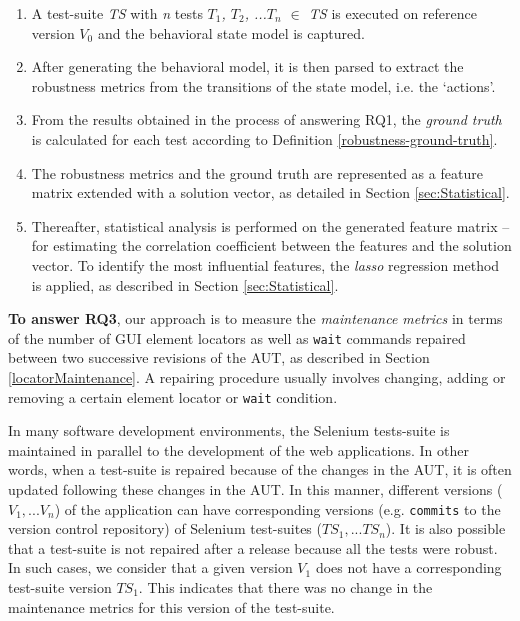 \begin{enumerate}

\item A test-suite \textit{TS} with \textit{n} tests \textit{$T_1$, $T_2$, ...$T_n$ $\in$ TS} is executed on reference version \textit{$V_{0}$} and the behavioral state model is captured. 

\item After generating the behavioral model, it is then parsed to extract the robustness metrics from the transitions of the state model, i.e. the `actions'.

\item From the results obtained in the process of answering RQ1, the \textit{ground truth} is calculated for each test  according to Definition \ref{robustness-ground-truth}.

\item The robustness metrics and the ground truth are represented as a feature matrix extended with a solution vector, as detailed in Section \ref{sec:Statistical}.

\item Thereafter, statistical analysis is performed on the generated feature matrix -- for estimating the correlation coefficient between the features and the solution vector. To identify the most influential features, the \textit{lasso} regression method is applied, as described in Section \ref{sec:Statistical}.
\end{enumerate}



\textbf{To answer RQ3}, our approach is to measure the \textit{maintenance metrics} in terms of the number of GUI element locators as well as \texttt{wait} commands repaired between two successive revisions of the AUT, as described in Section \ref{locatorMaintenance}. A repairing procedure usually involves changing, adding or removing a certain element locator or \texttt{wait} condition. 

In many software development environments, the Selenium tests-suite is maintained in parallel to the development of the web applications. In other words, when a test-suite is repaired because of the changes in the AUT, it is often updated following these changes in the AUT. In this manner, different versions (\textit{$V_1, ...V_n$}) of the application can have corresponding versions (e.g. \texttt{commits} to the version control repository) of Selenium test-suites (\textit{$TS_1, ...TS_n$}). It is also possible that a test-suite is not repaired after a release because all the tests were robust. In such cases, we consider that a given version $V_1$ does not have a corresponding test-suite version $TS_1$. This indicates that there was no change in the maintenance metrics for this version of the test-suite.

